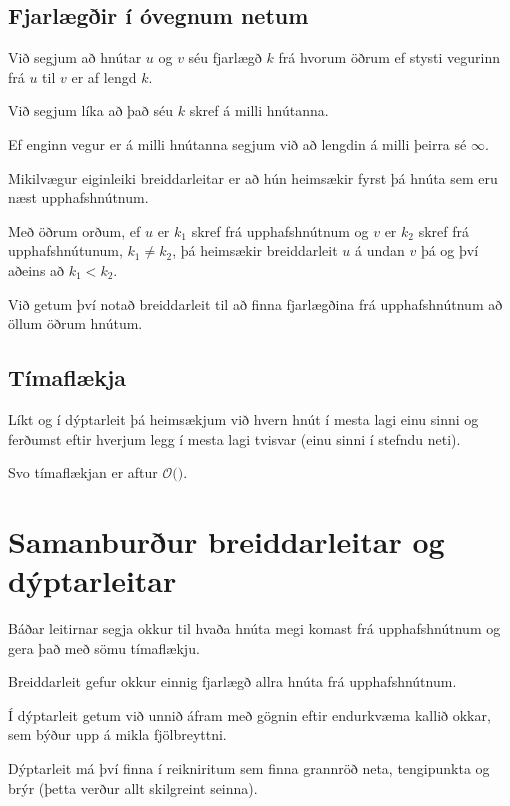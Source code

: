 \subsection{Fjarlægðir í óvegnum netum}
{
	{
		\item<1-> Við segjum að hnútar $u$ og $v$ séu fjarlægð $k$ frá hvorum öðrum ef stysti vegurinn frá $u$ til $v$ er af lengd $k$.
		\item<2-> Við segjum líka að það séu $k$ skref á milli hnútanna.
		\item<3-> Ef enginn vegur er á milli hnútanna segjum við að lengdin á milli þeirra sé $\infty$.
		\item<4-> Mikilvægur eiginleiki breiddarleitar er að hún heimsækir fyrst þá hnúta sem eru næst upphafshnútnum.
		\item<5-> Með öðrum orðum, ef $u$ er $k_1$ skref frá upphafshnútnum og $v$ er $k_2$ skref frá upphafshnútunum, $k_1 \neq k_2$,
					þá heimsækir breiddarleit $u$ á undan $v$ þá og því aðeins að $k_1 < k_2$.
		\item<6-> Við getum því notað breiddarleit til að finna fjarlægðina frá upphafshnútnum að öllum öðrum hnútum.
	}
}

\subsection{Tímaflækja}
{
	{
		\item<1-> Líkt og í dýptarleit þá heimsækjum við hvern hnút í mesta lagi einu sinni og
					ferðumst eftir hverjum legg í mesta lagi tvisvar (einu sinni í stefndu neti).
		\item<2-> Svo tímaflækjan er aftur $\mathcal{O}($\onslide<3->{$E + V$}$)$.
	}
}

\section{Samanburður breiddarleitar og dýptarleitar}
{
	{
		\item<1-> Báðar leitirnar segja okkur til hvaða hnúta megi komast frá upphafshnútnum og gera það með sömu tímaflækju.
		\item<2-> Breiddarleit gefur okkur einnig fjarlægð allra hnúta frá upphafshnútnum.
		\item<3-> Í dýptarleit getum við unnið áfram með gögnin eftir endurkvæma kallið okkar, sem býður upp á mikla fjölbreyttni.
		\item<4-> Dýptarleit má því finna í reikniritum sem finna grannröð neta, tengipunkta og brýr (þetta verður allt skilgreint seinna).
	}
}

